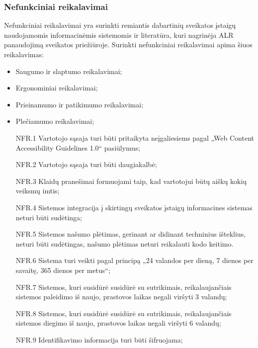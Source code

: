\subsubsection{Nefunkciniai reikalavimai}
Nefunkciniai reikalavimai yra surinkti remiantis dabartinių sveikatos įstaigų naudojamomis informacinėmis sistemomis ir literatūra, kuri nagrinėja ALR panaudojimą sveikatos priežiūroje. Surinkti nefunkciniai reikalavimai apima šiuos reikalavimas:
\begin{itemize}
    \item Saugumo ir slaptumo reikalavimai;
    \item Ergonominiai reikalavimai;
    \item Prieinamumo ir patikimumo reikalavimai;
    \item Plečiamumo reikalavimai;
\end{itemize}

\begin{itemize}
    \item [NFR.1] Vartotojo sąsaja turi būti pritaikyta neįgaliesiems pagal „Web Content Accessibility Guidelines 1.0“ pasiūlymus;
    \item [NFR.2] Vartotojo sąsaja turi būti daugiakalbė;
    \item [NFR.3] Klaidų pranešimai formuojami taip, kad vartotojui būtų aiškų kokių veiksmų imtis;
    \item [NFR.4] Sistemos integracija į skirtingų sveikatos įstaigų informacines sistemas neturi būti sudėtinga;
    \item [NFR.5] Sistemos našumo plėtimas, gerinant ar didinant techninius išteklius, neturi būti sudėtingas, našumo plėtimas neturi reikalauti kodo keitimo.
    \item [NFR.6] Sistema turi veikti pagal principą „24 valandos per dieną, 7 dienos per savaitę, 365 dienos per metus“;
    \item [NFR.7] Sistemos, kuri susidūrė susidūrė su sutrikimais, reikalaujančiais sistemos paleidimo iš naujo, prastovos laikas negali viršyti 3 valandų;
    \item [NFR.8] Sistemos, kuri susidūrė susidūrė su sutrikimais, reikalaujančiais sistemos diegimo iš naujo, prastovos laikas negali viršyti 6 valandų;
    \item [NFR.9] Identifikavimo informacija turi būti šifruojama;
\end{itemize}